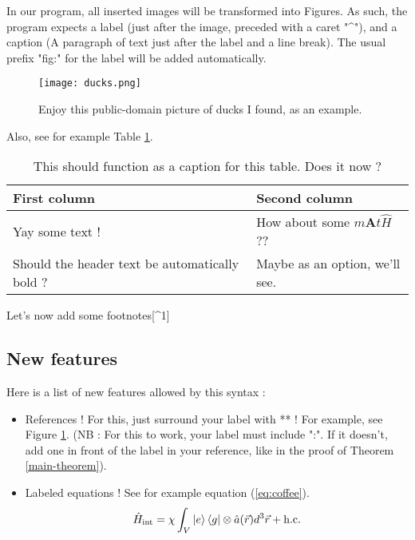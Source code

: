 \documentclass{article}
\begin{document}
\begin{maincontent}
In our program, all inserted images will be transformed into Figures. As such, the program expects a label (just after the image, preceded with a caret "\^{}"), and a caption (A paragraph of text just after the label and a line break). The usual prefix "fig:" for the label will be added automatically.


\begin{figure}
    \centering
    \texttt{[image: ducks.png]}
    \caption{Enjoy this public-domain picture of ducks I found, as an example.}
    \label{fig:ducks}
\end{figure}
        

Also, see for example Table \ref{tab:cool-table}.

\begin{table}
    \centering
    \begin{tabular}{l|l}
First column & Second column \\
\hline
Yay some text ! & How about some $m\mathbf{A}t\hat{H}$ ?? \\
Should the header text be automatically bold ? & Maybe as an option, we'll see. \\

\end{tabular}

    \caption{This should function as a caption for this table. Does it now ?}
    \label{tab:cool-table}
\end{table}
        
Let's now add some footnotes[\^{}1]

\subsection{New features}

Here is a list of new features allowed by this syntax :
\begin{itemize}
\item 
References ! For this, just surround your label with ** ! For example, see Figure \ref{fig:ducks}. (NB : For this to work, your label must include ":". If it doesn't, add one in front of the label in your reference, like in the proof of Theorem \ref{main-theorem}).

\item 
Labeled equations ! See for example equation (\ref{eq:coffee}).\begin{equation}
	\hat{H}_{\text{int}}=\chi\int _{V}\ket{e} \bra{g} \otimes \hat{a}(\vec{r})d^{3}\vec{r}+\text{h.c.}
\label{eq:coffee}\end{equation}



\end{itemize}
\end{maincontent}
\end{document}

